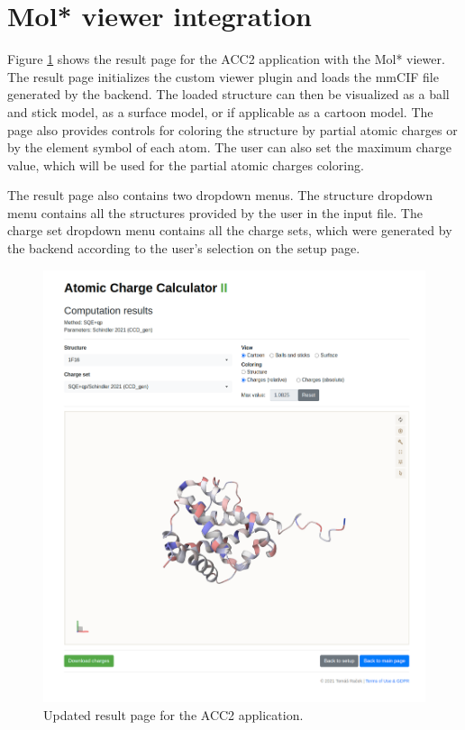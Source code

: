 \documentclass[
  digital,     %
  oneside,     %
  nosansbold,  %
  nocolorbold, %
  lof,         %
  lot,         %
]{fithesis4}
\begin{document}
\section{Mol* viewer integration}
\label{section:viewer_integration}

Figure \ref{fig:result_page} shows the result page for the ACC2 application with the Mol* viewer. The result page initializes the custom viewer plugin and loads the mmCIF file generated by the backend. The loaded structure can then be visualized as a ball and stick model, as a surface model, or if applicable as a cartoon model. The page also provides controls for coloring the structure by partial atomic charges or by the element symbol of each atom. The user can also set the maximum charge value, which will be used for the partial atomic charges coloring.

The result page also contains two dropdown menus. The structure dropdown menu contains all the structures provided by the user in the input file. The charge set dropdown menu contains all the charge sets, which were generated by the backend according to the user's selection on the setup page.

\begin{figure}[htbp]
  \begin{center}
    \includegraphics[width=\textwidth]{figures/results-full.png}
  \end{center}
  \caption{Updated result page for the ACC2 application.}
  \label{fig:result_page}
\end{figure}
\end{document}
